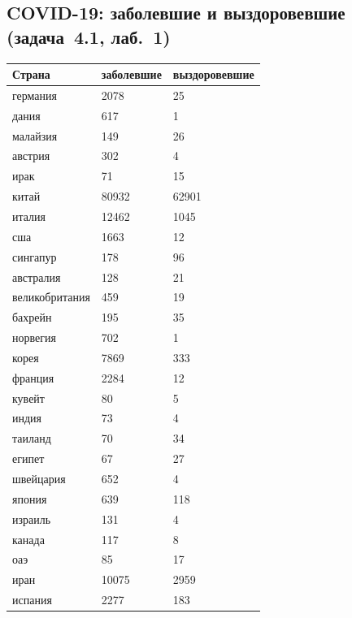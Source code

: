 \subsection{COVID-19: заболевшие и выздоровевшие (задача~4.1, лаб.~1)}
\label{app:data-corona}
\begin{center}
\footnotesize
\begin{tabular}{@{}lll@{}}
 \toprule
\textbf{Страна} & \textbf{заболевшие} & \textbf{выздоровевшие} \\
 \midrule
германия & 2078 & 25 \\
дания & 617 & 1 \\
малайзия & 149 & 26 \\
австрия & 302 & 4 \\
ирак & 71 & 15 \\
китай & 80932 & 62901 \\
италия & 12462 & 1045 \\
сша & 1663 & 12 \\
сингапур & 178 & 96 \\
австралия & 128 & 21 \\
великобритания & 459 & 19 \\
бахрейн & 195 & 35 \\
норвегия & 702 & 1 \\
корея & 7869 & 333 \\
франция & 2284 & 12 \\
кувейт & 80 & 5 \\
индия & 73 & 4 \\
таиланд & 70 & 34 \\
египет & 67 & 27 \\
швейцария & 652 & 4 \\
япония & 639 & 118 \\
израиль & 131 & 4 \\
канада & 117 & 8 \\
оаэ & 85 & 17 \\
иран & 10075 & 2959 \\
испания & 2277 & 183 \\
 \bottomrule
\end{tabular}
\end{center}

